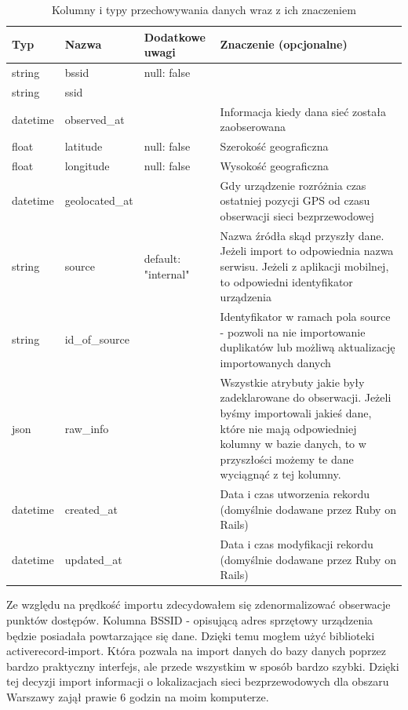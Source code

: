 \begin{table}
\caption{Kolumny i typy przechowywania danych wraz z ich znaczeniem}
\label{table:dbscheme}
\begin{tabular} { |l|l|l|p{6cm}|  }
\hline
Typ & Nazwa & Dodatkowe uwagi & Znaczenie (opcjonalne) \\
\hline
\hline
string   & bssid & null: false & \\
\hline
string   & ssid & & \\
\hline
datetime & observed\_at & & Informacja kiedy dana sieć została zaobserowana \\
\hline
float    & latitude & null: false & Szerokość geograficzna \\
\hline
float    & longitude & null: false & Wysokość geograficzna \\
\hline
datetime & geolocated\_at & & Gdy urządzenie rozróżnia czas ostatniej pozycji GPS od czasu obserwacji sieci bezprzewodowej \\
\hline
string   & source & default: "internal" & Nazwa źródła skąd przyszły dane. Jeżeli import to odpowiednia nazwa serwisu. Jeżeli z aplikacji mobilnej, to odpowiedni identyfikator urządzenia \\
\hline
string   & id\_of\_source & & Identyfikator w ramach pola source - pozwoli na nie importowanie duplikatów lub możliwą aktualizację importowanych danych \\
\hline
json     & raw\_info & & Wszystkie atrybuty jakie były zadeklarowane do obserwacji. Jeżeli byśmy importowali jakieś dane, które nie mają odpowiedniej kolumny w bazie danych, to w przyszłości możemy te dane wyciągnąć z tej kolumny. \\
\hline
datetime & created\_at & & Data i czas utworzenia rekordu (domyślnie dodawane przez Ruby on Rails) \\
\hline
datetime & updated\_at & & Data i czas modyfikacji rekordu (domyślnie dodawane przez Ruby on Rails) \\
\hline
\end{tabular}
\end{table}

Ze względu na prędkość importu zdecydowałem się zdenormalizować obserwacje punktów dostępów. Kolumna BSSID - opisującą adres sprzętowy urządzenia będzie posiadała powtarzające się dane. Dzięki temu mogłem użyć biblioteki activerecord-import. Która pozwala na import danych do bazy danych poprzez bardzo praktyczny interfejs, ale przede wszystkim w sposób bardzo szybki. Dzięki tej decyzji import informacji o lokalizacjach sieci bezprzewodowych dla obszaru Warszawy zajął prawie 6 godzin na moim komputerze.

